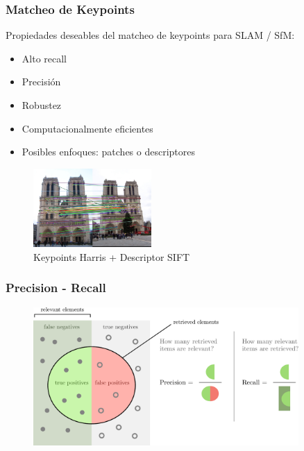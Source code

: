 \begin{frame}
	\frametitle{Matcheo de Keypoints}
	\footnotesize
	Propiedades deseables del matcheo de keypoints para SLAM / SfM:
	\begin{itemize}
		\item Alto recall
		\item Precisión
		\item Robustez
		\item Computacionalmente eficientes
		\item Posibles enfoques: patches o descriptores
	\end{itemize}
	
	\begin{figure}
		\includegraphics[width=0.4\textwidth]{./images/matching_notredam.jpg}
		\caption{Keypoints Harris + Descriptor SIFT}
	\end{figure}
\end{frame}

\begin{frame}
	\frametitle{Precision - Recall}
	\footnotesize
	
	
	\begin{figure}
		\includegraphics[width=0.9\textwidth]{./images/precision_recall.pdf}
	\end{figure}
\end{frame}

